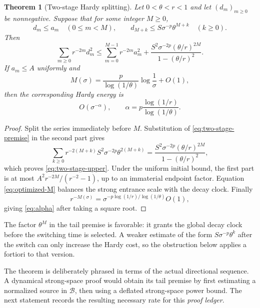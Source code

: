\documentclass[11pt]{article}
\newtheorem{theorem}{Theorem}[section]
\theoremstyle{remark}
\newcommand{\cB}{\mathcal B}
\begin{document}
\begin{theorem}[Two-stage Hardy splitting]
\label{thm:two-stage}
Let $0<\theta<r<1$ and let $(d_m)_{m\ge0}$ be nonnegative.  Suppose that for
some integer $M\ge0$,
\begin{equation}
 d_m\le a_m\quad(0\le m<M),
 \qquad
 d_{M+k}\le S\sigma^{-p}\theta^{M+k}\quad(k\ge0).
 \label{eq:two-stage-premise}
\end{equation}
Then
\begin{equation}
 \boxed{
 \sum_{m\ge0}r^{-2m}d_m^2
 \le
 \sum_{m=0}^{M-1}r^{-2m}a_m^2
 +
 \frac{S^2\sigma^{-2p}(\theta/r)^{2M}}
 {1-(\theta/r)^2}.}
 \label{eq:two-stage-upper}
\end{equation}
If $a_m\le A$ uniformly and
\begin{equation}
 M(\sigma)
 =\frac{p}{\log(1/\theta)}\log\frac1\sigma+O(1),
 \label{eq:optimized-M}
\end{equation}
then the corresponding Hardy energy is
\begin{equation}
 O(\sigma^{-\alpha}),
 \qquad
 \boxed{
 \alpha=p\frac{\log(1/r)}{\log(1/\theta)}.}
 \label{eq:alpha}
\end{equation}
\end{theorem}

\begin{proof}
Split the series immediately before $M$.  Substitution of
\eqref{eq:two-stage-premise} in the second part gives
\[
 \sum_{k\ge0}r^{-2(M+k)}S^2\sigma^{-2p}\theta^{2(M+k)}
 =\frac{S^2\sigma^{-2p}(\theta/r)^{2M}}
 {1-(\theta/r)^2},
\]
which proves \eqref{eq:two-stage-upper}.  Under the uniform initial bound,
the first part is at most $A^2r^{-2M}/(r^{-2}-1)$, up to an immaterial
endpoint factor.  Equation \eqref{eq:optimized-M} balances the strong
entrance scale with the decay clock.  Finally
\[
 r^{-M(\sigma)}
 =\sigma^{-p\log(1/r)/\log(1/\theta)}O(1),
\]
giving \eqref{eq:alpha} after taking a square root.
\end{proof}

The factor $\theta^M$ in the tail premise is favorable: it grants the
global decay clock before the switching time is selected.  A weaker estimate
of the form $S\sigma^{-p}\theta^k$ after the switch can only increase the
Hardy cost, so the obstruction below applies a fortiori to that version.

The theorem is deliberately phrased in terms of the actual directional
sequence.  A dynamical strong-space proof would obtain its tail premise by
first estimating a normalized source in $\cB$, then using a deflated
strong-space power bound.  The next statement records the resulting
necessary rate for this \emph{proof ledger}.
\end{document}
